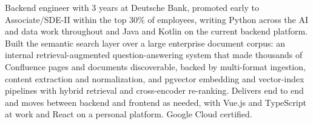\documentclass[11pt,a4paper,sans]{moderncv}
\begin{document}
\makecvtitle


\vspace{6pt}
\small{Backend engineer with 3 years at Deutsche Bank, promoted early to Associate/SDE-II within the top 30\% of employees, writing Python across the AI and data work throughout and Java and Kotlin on the current backend platform. Built the semantic search layer over a large enterprise document corpus: an internal retrieval-augmented question-answering system that made thousands of Confluence pages and documents discoverable, backed by multi-format ingestion, content extraction and normalization, and pgvector embedding and vector-index pipelines with hybrid retrieval and cross-encoder re-ranking. Delivers end to end and moves between backend and frontend as needed, with Vue.js and TypeScript at work and React on a personal platform. Google Cloud certified.}

\end{document}
